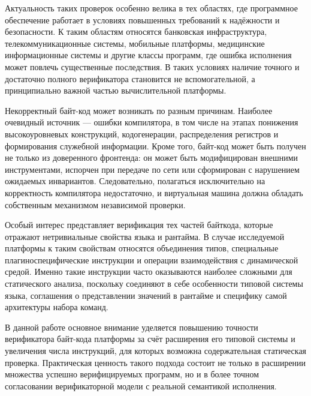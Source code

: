 Актуальность таких проверок особенно велика в тех областях, где программное обеспечение работает в
условиях повышенных требований к надёжности и безопасности. К таким областям относятся банковская инфраструктура,
телекоммуникационные системы, мобильные платформы, медицинские
информационные системы и другие классы программ, где ошибка исполнения может повлечь существенные последствия. В таких условиях наличие
точного и достаточно полного верификатора становится не вспомогательной, а принципиально важной
частью вычислительной платформы.

Некорректный байт-код может возникать по разным причинам. Наиболее очевидный источник --- ошибки
компилятора, в том числе на этапах понижения высокоуровневых конструкций, кодогенерации,
распределения регистров и формирования служебной информации. Кроме того, байт-код может быть
получен не только из доверенного фронтенда: он может быть модифицирован внешними инструментами,
испорчен при передаче по сети или сформирован с нарушением ожидаемых инвариантов. Следовательно,
полагаться исключительно на корректность компилятора недостаточно, и виртуальная машина должна
обладать собственным механизмом независимой проверки.

Особый интерес представляет верификация тех частей байткода, которые отражают нетривиальные
свойства языка и рантайма. В случае исследуемой платформы к таким свойствам относятся объединения
типов, специальные плагиноспецифические инструкции и операции взаимодействия с динамической средой. Именно такие
инструкции часто оказываются наиболее сложными для статического анализа, поскольку соединяют в
себе особенности типовой системы языка, соглашения о представлении значений в рантайме и специфику
самой архитектуры набора команд.

В данной работе основное внимание уделяется повышению точности верификатора байт-кода платформы
за счёт расширения его типовой системы и увеличения числа инструкций, для которых возможна
содержательная статическая проверка. Практическая ценность такого подхода состоит не только в
расширении множества успешно верифицируемых программ, но и в более точном согласовании
верификаторной модели с реальной семантикой исполнения.

